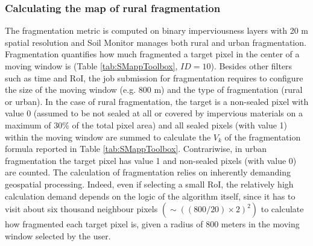 \documentclass[APA,LATO1COL,doublespace]{WileyNJD-v2}
\begin{document}
\subsubsection{Calculating the map of rural fragmentation}
\label{sec:mmFragmentation}
The fragmentation metric is computed on binary imperviousness layers with 20 m spatial resolution and Soil Monitor manages both rural and urban fragmentation.
Fragmentation quantifies how much fragmented %
a target pixel in the center of a moving window is (Table \ref{tab:SMappToolbox}, $ID = 10$).
Besides other filters such as time and RoI, the job submission for fragmentation requires to configure the size of the moving window (e.g. 800 m) and the type of fragmentation (rural or urban).
In the case of rural fragmentation, the target is a non-sealed pixel with value 0 (assumed to be not sealed at all or covered by impervious materials on a maximum of 30\% of the total pixel area) and all sealed pixels (with value 1) within the moving window are summed to calculate the $V_k$ of the fragmentation formula reported in Table \ref{tab:SMappToolbox}.
Contrariwise, in urban fragmentation the target pixel has value 1 and non-sealed pixels (with value 0) are counted.
The calculation of fragmentation relies on inherently demanding geospatial processing.
Indeed, even if selecting a small RoI, the relatively high calculation demand depends on the logic of the algorithm itself, since it has to visit about six thousand neighbour pixels $\left( \sim \left( \left(800/20\right)\times2 \right)^2 \right)$ to calculate how fragmented each target pixel is, given a radius of 800 meters in the moving window selected by the user.
\end{document}
